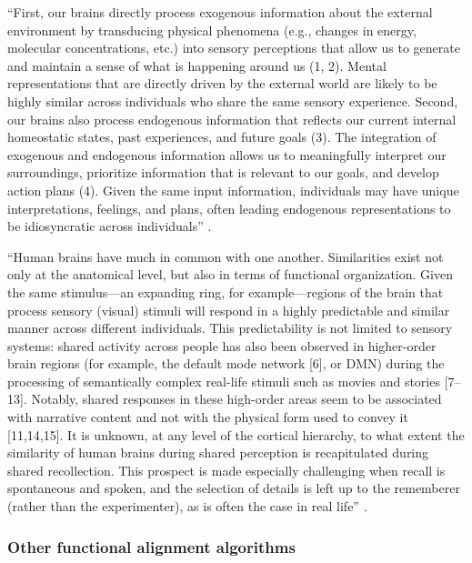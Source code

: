 ``First, our brains directly process exogenous information about the external
environment by transducing physical phenomena (e.g., changes in energy,
molecular concentrations, etc.) into sensory perceptions that allow us to
generate and maintain a sense of what is happening around us (1, 2). Mental
representations that are directly driven by the external world are likely to be
highly similar across individuals who share the same sensory experience. Second,
our brains also process endogenous information that reflects our current
internal homeostatic states, past experiences, and future goals (3). The
integration of exogenous and endogenous information allows us to meaningfully
interpret our surroundings, prioritize information that is relevant to our
goals, and develop action plans (4). Given the same input information,
individuals may have unique interpretations, feelings, and plans, often leading
endogenous representations to be idiosyncratic across individuals''
\citep{chang2021endogenous}.

``Human brains have much in common with one another. Similarities exist not only
at the anatomical level, but also in terms of functional organization. Given the
same stimulus—an expanding ring, for example—regions of the brain that process
sensory (visual) stimuli will respond in a highly predictable and similar manner
across different individuals. This predictability is not limited to sensory
systems: shared activity across people has also been observed in higher-order
brain regions (for example, the default mode network [6], or DMN) during the
processing of semantically complex real-life stimuli such as movies and
stories [7–13]. Notably, shared responses in these high-order areas seem to be
associated with narrative content and not with the physical form used to convey
it [11,14,15]. It is unknown, at any level of the cortical hierarchy, to what
extent the similarity of human brains during shared perception is recapitulated
during shared recollection. This prospect is made especially challenging when
recall is spontaneous and spoken, and the selection of details is left up to
the rememberer (rather than the experimenter), as is often the case in real
life'' \citep{chen2017shared}.




\subsubsection{Other functional alignment algorithms}


